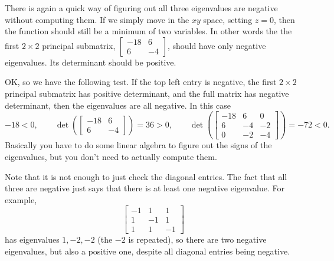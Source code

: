 \documentclass[12pt]{article}
\begin{document}
There is again a quick way of figuring out all three eigenvalues are
negative without computing them.  If we simply move in the $xy$ space,
setting $z=0$,
then the function should still be a minimum of two variables.  In other
words the 
the first $2 \times 2$ principal submatrix,
$\left[ \begin{smallmatrix} -18 & 6 \\ 6 & -4 \end{smallmatrix} \right]$,
should have only negative eigenvalues.  Its determinant should be positive.

OK, so we have the following test.
If the top left
entry is negative, the first $2 \times 2$ principal submatrix has positive
determinant, and the full matrix has negative determinant, then the
eigenvalues are all negative.  In this case 
\begin{equation*}
-18 < 0,
\qquad
\det \left(
\begin{bmatrix}
-18 & 6 \\
6 & -4
\end{bmatrix}
\right) = 36 > 0 ,
\qquad
\det \left(
\begin{bmatrix}
-18 & 6 & 0 \\
6 & -4 & -2 \\
0 & -2 & -4
\end{bmatrix}
\right) = -72 < 0 .
\end{equation*}
Basically you have to do some linear algebra to figure
out the signs of the eigenvalues, but you don't need to
actually compute them.

Note that it is not enough to just check the diagonal entries.  The fact
that all three are negative just says that there is at least one negative
eigenvalue.  For example, 
$$
\begin{bmatrix}
-1 & 1 & 1 \\
1 & -1 & 1 \\
1 & 1 & -1
\end{bmatrix}
$$
has eigenvalues $1,-2,-2$ (the $-2$ is repeated), so there are two negative
eigenvalues, but also a positive one, despite all diagonal entries being
negative.
\end{document}
